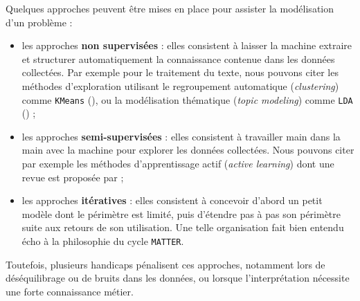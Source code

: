 			\begin{leftBarIdea}
				Quelques approches peuvent être mises en place pour assister la modélisation d'un problème :
				\begin{itemize}
					\item les approches \textbf{non supervisées} :
					elles consistent à laisser la machine extraire et structurer automatiquement la connaissance contenue dans les données collectées.
					Par exemple pour le traitement du texte, nous pouvons citer les méthodes d'exploration utilisant le regroupement automatique (\textit{clustering}) comme \texttt{KMeans} (\cite{macqueen:1967:methods-classification-analysis}), ou la modélisation thématique (\textit{topic modeling}) comme \texttt{LDA} (\cite{blei-etal:2003:latent-dirichlet-allocation}) ;
					\item les approches \textbf{semi-supervisées} :
					elles consistent à travailler main dans la main avec la machine pour explorer les données collectées.
					Nous pouvons citer par exemple les méthodes d'apprentissage actif (\textit{active learning}) dont une revue est proposée par \cite{settles:2010:active-learning-literature} ;
					\item les approches \textbf{itératives} :
					elles consistent à concevoir d'abord un petit modèle dont le périmètre est limité, puis d'étendre pas à pas son périmètre suite aux retours de son utilisation.
					Une telle organisation fait bien entendu écho à la philosophie du cycle \texttt{MATTER}.
				\end{itemize}
				Toutefois, plusieurs handicaps pénalisent ces approches, notamment lors de déséquilibrage ou de bruits dans les données, ou lorsque l'interprétation nécessite une forte connaissance métier.
			\end{leftBarIdea}
			
